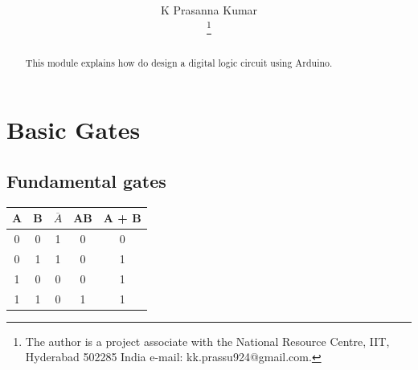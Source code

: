 \documentclass[journal,12pt,twocolumn]{IEEEtran}
\begin{document}

 
\title{
} 
 
%
%
%

\author{K Prasanna Kumar %

\thanks{The author is a project associate with the National Resource Centre, IIT, Hyderabad
502285 India e-mail: kk.prassu924@gmail.com. 
}}



\maketitle


\tableofcontents

\bigskip
\begin{abstract}
This module explains how do design a digital logic circuit using Arduino.
\end{abstract}
\section{Basic Gates}
\subsection{Fundamental gates}
\begin{table}[h!]
\centering
\begin{tabular}{|cc|c|c|c|}
\hline
A	&	B	&	$\overline{A}$	&	AB	&	A + B	\\ \hline
0	&	0	&	1	&	0	&	0 \\ \hline
0	&	1	&	1	&	0	&	1 \\\hline
1	&	0	&	0	&	0	&	1 \\\hline
1	&	1	&	0	&	1	&	1 \\\hline	

\end{tabular}
\end{table}

\end{document}
